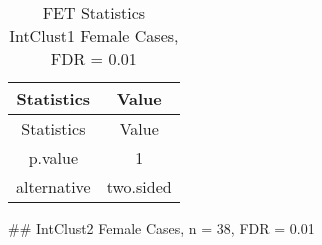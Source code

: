 \documentclass[]{article}
\begin{document}
\begin{longtable}[]{@{}cc@{}}
\caption{FET Statistics IntClust1 Female Cases, FDR =
0.01}\tabularnewline
\toprule
\begin{minipage}[b]{0.18\columnwidth}\centering\strut
Statistics\strut
\end{minipage} & \begin{minipage}[b]{0.14\columnwidth}\centering\strut
Value\strut
\end{minipage}\tabularnewline
\midrule
\endfirsthead
\toprule
\begin{minipage}[b]{0.18\columnwidth}\centering\strut
Statistics\strut
\end{minipage} & \begin{minipage}[b]{0.14\columnwidth}\centering\strut
Value\strut
\end{minipage}\tabularnewline
\midrule
\endhead
\begin{minipage}[t]{0.18\columnwidth}\centering\strut
p.value\strut
\end{minipage} & \begin{minipage}[t]{0.14\columnwidth}\centering\strut
1\strut
\end{minipage}\tabularnewline
\begin{minipage}[t]{0.18\columnwidth}\centering\strut
alternative\strut
\end{minipage} & \begin{minipage}[t]{0.14\columnwidth}\centering\strut
two.sided\strut
\end{minipage}\tabularnewline
\bottomrule
\end{longtable}

\pagebreak
\#\# IntClust2 Female Cases, n = 38, FDR = 0.01
\end{document}
